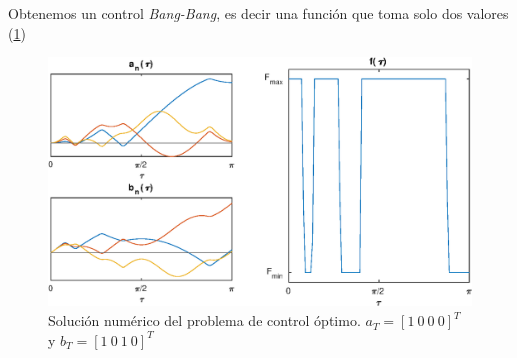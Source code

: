 Obtenemos un control \emph{Bang-Bang}, es decir una función que toma solo dos valores (\ref{figbang})



\begin{figure}[]
    \centering
    \includegraphics[scale=0.7]{fig/img03.eps}
    \caption{Solución numérico del problema de control óptimo. $a_T = [1 \ 0 \ 0 \ 0]^T$ y 
    $b_T = [1 \ 0 \ 1 \ 0]^T$}
    \label{figbang}
\end{figure}



